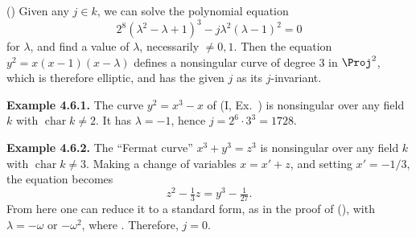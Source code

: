 {() Given any $j\in k$, we can solve the polynomial equation
\[
2^8(\lambda^2-\lambda+1)^3-j\lambda^2(\lambda-1)^2=0
\]
\noindent for $\lambda$, and find a value of $\lambda$, necessarily $\ne0,1$. Then the equation $y^2=x(x-1)(x-\lambda)$ defines a nonsingular curve of degree $3$ in $\Proj^2$, which is therefore elliptic, and has the given $j$ as its $j$-invariant.

\medskip
\noindent\hypertarget{result-IV-4.6.1}{}\textbf{Example 4.6.1.} The curve $y^2=x^3-x$ of (I, Ex.~) is nonsingular over any field $k$ with $\operatorname{char}k\ne2$. It has $\lambda=-1$, hence $j=2^6\cdot3^3=1728$.

\medskip
\noindent\hypertarget{result-IV-4.6.2}{}\textbf{Example 4.6.2.} The \textquotedblleft{}Fermat curve\textquotedblright{} $x^3+y^3=z^3$ is nonsingular over any field $k$ with $\operatorname{char}k\ne3$. Making a change of variables $x=x'+z$, and setting $x'=-1/3$, the equation becomes
\[
z^2-\tfrac13z=y^3-\tfrac1{27}.
\]
\noindent From here one can reduce it to a standard form, as in the proof of (), with $\lambda=-\omega$ or $-\omega^2$, where . Therefore, $j=0$.
}
